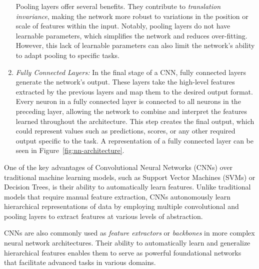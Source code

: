 \begin{enumerate}
    Pooling layers offer several benefits. They contribute to \textit{translation invariance}, making the network more robust to variations in the position or scale of features within the input. Notably, pooling layers do not have learnable parameters, which simplifies the network and reduces over-fitting. However, this lack of learnable parameters can also limit the network's ability to adapt pooling to specific tasks. 

    \item \textit{Fully Connected Layers:} In the final stage of a CNN, fully connected layers generate the network's output. These layers take the high-level features extracted by the previous layers and map them to the desired output format. Every neuron in a fully connected layer is connected to all neurons in the preceding layer, allowing the network to combine and interpret the features learned throughout the architecture. This step creates the final output, which could represent values such as predictions, scores, or any other required output specific to the task. A representation of a fully connected layer can be seen in Figure~\ref{fig:nn-architecture}.
    
\end{enumerate}

One of the key advantages of Convolutional Neural Networks (CNNs) over traditional machine learning models, such as Support Vector Machines (SVMs) or Decision Trees, is their ability to automatically learn features. Unlike traditional models that require manual feature extraction, CNNs autonomously learn hierarchical representations of data by employing multiple convolutional and pooling layers to extract features at various levels of abstraction.

CNNs are also commonly used as \textit{feature extractors} or \textit{backbones} in more complex neural network architectures. Their ability to automatically learn and generalize hierarchical features enables them to serve as powerful foundational networks that facilitate advanced tasks in various domains.

